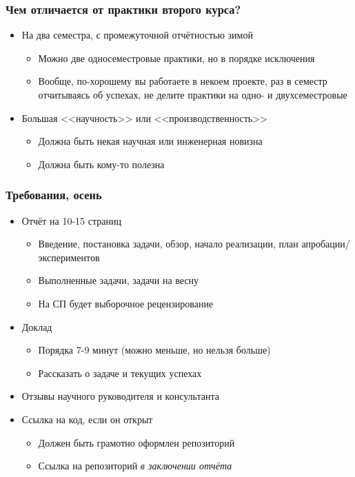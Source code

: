 \documentclass{../../slides-style}
\begin{document}
    
    \begin{frame}[plain]
        \titlepage
    \end{frame}

    \begin{frame}
        \frametitle{Чем отличается от практики второго курса?}
        \begin{itemize}
            \item На два семестра, с промежуточной отчётностью зимой
            \begin{itemize}
                \item Можно две односеместровые практики, но в порядке исключения
                \item Вообще, по-хорошему вы работаете в некоем проекте, раз в семестр отчитываясь об успехах, не делите практики на одно- и двухсеместровые
            \end{itemize}
            \item Большая <<научность>> или <<производственность>>
            \begin{itemize}
                \item Должна быть некая научная или инженерная новизна
                \item Должна быть кому-то полезна
            \end{itemize}
        \end{itemize}
    \end{frame}

    \begin{frame}
        \frametitle{Требования, осень}
        \begin{itemize}
            \item Отчёт на 10-15 страниц
            \begin{itemize}
                \item Введение, постановка задачи, обзор, начало реализации, план апробации/экспериментов
                \item Выполненные задачи, задачи на весну
                \item На СП будет выборочное рецензирование
            \end{itemize}
            \item Доклад
            \begin{itemize}
                \item Порядка 7-9 минут (можно меньше, но нельзя больше)
                \item Рассказать о задаче и текущих успехах
            \end{itemize}
            \item Отзывы научного руководителя и консультанта
            \item Ссылка на код, если он открыт
            \begin{itemize}
                \item Должен быть грамотно оформлен репозиторий
                \item Ссылка на репозиторий \emph{в заключении отчёта}
            \end{itemize}
        \end{itemize}
    \end{frame}
\end{document}
